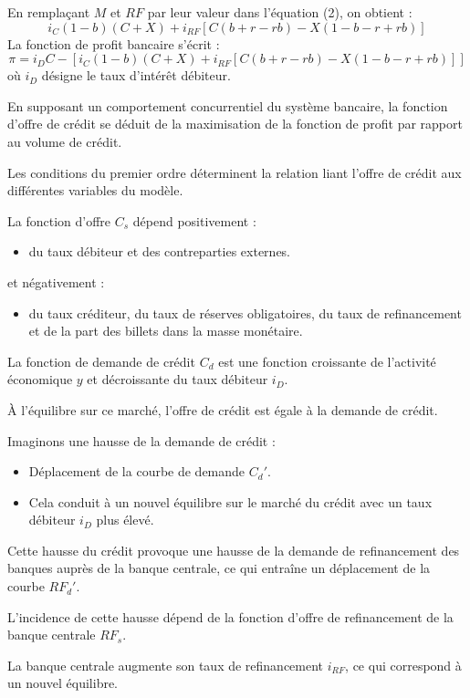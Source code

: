 \documentclass[a4paper, 12pt]{report}
\begin{document}
En remplaçant \( M \) et \( RF \) par leur valeur dans l'équation (2), on obtient :  
\[
i_C (1-b) (C+X) + i_{RF} \left[ C (b+r-rb) - X (1-b-r+rb) \right]
\]
La fonction de profit bancaire s'écrit :  
\[
\pi = i_D C - \left[ i_C (1-b) (C+X) + i_{RF} \left[ C (b+r-rb) - X (1-b-r+rb) \right] \right]
\]
où \( i_D \) désigne le taux d'intérêt débiteur.  

En supposant un comportement concurrentiel du système bancaire, la fonction d'offre de crédit se déduit de la maximisation de la fonction de profit par rapport au volume de crédit.  

Les conditions du premier ordre déterminent la relation liant l'offre de crédit aux différentes variables du modèle.

La fonction d'offre \( C_s \) dépend positivement :  
\begin{itemize}
	\item du taux débiteur et des contreparties externes.
\end{itemize}

et négativement :  
\begin{itemize}
	\item du taux créditeur, du taux de réserves obligatoires, du taux de refinancement et de la part des billets dans la masse monétaire.
\end{itemize}

La fonction de demande de crédit \( C_d \) est une fonction croissante de l'activité économique \( y \) et décroissante du taux débiteur \( i_D \).  

À l'équilibre sur ce marché, l'offre de crédit est égale à la demande de crédit.  

Imaginons une hausse de la demande de crédit :  
\begin{itemize}
	\item Déplacement de la courbe de demande \( C_d' \).
	\item Cela conduit à un nouvel équilibre sur le marché du crédit avec un taux débiteur \( i_D \) plus élevé.
\end{itemize}

Cette hausse du crédit provoque une hausse de la demande de refinancement des banques auprès de la banque centrale, ce qui entraîne un déplacement de la courbe \( RF_d' \).  

L'incidence de cette hausse dépend de la fonction d'offre de refinancement de la banque centrale \( RF_s \).  

La banque centrale augmente son taux de refinancement \( i_{RF} \), ce qui correspond à un nouvel équilibre.  
\end{document}
